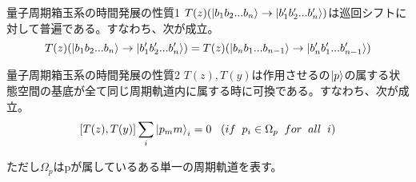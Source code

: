 \documentclass[aspectratio=169, dvipdfmx, 11pt]{beamer} %
\begin{document}
\begin{frame}{量子周期箱玉系の時間発展の性質1}
$T(z)(\ket{b_1b_2...b_n} \rightarrow \ket{b'_1b'_2...b'_n})$は巡回シフトに対して普遍である。すなわち、次が成立。
$$T(z)(\ket{b_1b_2...b_n} \rightarrow \ket{b'_1b'_2...b'_n}) = T(z)(\ket{b_nb_1...b_{n-1}} \rightarrow \ket{b'_nb'_1...b'_{n-1}})$$

\end{frame}
\begin{frame}{量子周期箱玉系の時間発展の性質2}
$T(z),T(y)$は作用させるの$\ket{p}$の属する状態空間の基底が全て同じ周期軌道内に属する時に可換である。すなわち、次が成立。\\

$$[T(z),T(y)] \sum_i \ket{p_mm}_i = 0 \;\;\; (if \;\; p_i \in \Omega_p \;\;for \;\;all \;\;i )$$

ただし$\Omega_p$はpが属しているある単一の周期軌道を表す。\\

\end{frame}


\begin{frame}{}
\end{frame}
\end{document}
